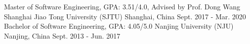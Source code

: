 
\begin{cventries}

  \cventry
    {Master of Software Engineering, GPA: 3.51/4.0, Advised by Prof. Dong Wang} %
    {Shanghai Jiao Tong University (SJTU)} %
    {Shanghai, China} %
    {Sept. 2017 - Mar. 2020} %
    {}
 \EntryGap
  \cventry
    {Bachelor of Software Engineering, GPA: 4.05/5.0} %
    {Nanjing University (NJU)} %
    {Nanjing, China} %
    {Sept. 2013 - Jun. 2017} %
    {}
\end{cventries}

